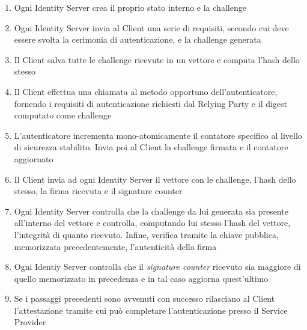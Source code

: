 \begin{enumerate}
	\item Ogni Identity Server crea il proprio stato interno e la challenge
	\item Ogni Identity Server invia al Client una serie di requisiti, secondo cui deve essere svolta la cerimonia di autenticazione, e la challenge generata
	\item Il Client salva tutte le challenge ricevute in un vettore e computa l'hash dello stesso
	\item Il Client effettua una chiamata al metodo opportuno dell'autenticatore, fornendo i requisiti di autenticazione richiesti dal Relying Party e il digest computato come challenge
	\item L'autenticatore incrementa mono-atomicamente il contatore specifico al livello di sicurezza stabilito. Invia poi al Client la challenge firmata e il contatore aggiornato
	\item Il Client invia ad ogni Identity Server il vettore con le challenge, l'hash dello stesso, la firma ricevuta e il signature counter
	\item Ogni Identity Server controlla che la challenge da lui generata sia presente all'interno del vettore e controlla, computando lui stesso l'hash del vettore, l'integrità di quanto ricevuto. Infine, verifica tramite la chiave pubblica, memorizzata precedentemente, l'autenticità della firma
	\item Ogni Identiy Server controlla che il \emph{signature counter} ricevuto sia maggiore di quello memorizzato in precedenza e in tal caso aggiorna quest'ultimo
	\item Se i passaggi precedenti sono avvenuti con successo rilasciano al Client l'attestazione tramite cui può completare l'autenticazione presso il Service Provider
\end{enumerate}